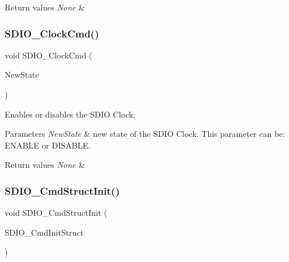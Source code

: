 \begin{DoxyRetVals}{Return values}
{\em None} & \\
\hline
\end{DoxyRetVals}
\mbox{\label{group___s_d_i_o___exported___functions_ga7243b857d6b323748ff3a493b265bedc}} 
\subsubsection{\texorpdfstring{SDIO\_ClockCmd()}{SDIO\_ClockCmd()}}
{\footnotesize\ttfamily void S\+D\+I\+O\+\_\+\+Clock\+Cmd (\begin{DoxyParamCaption}\item[{\mbox{\hyperlink{group___exported__types_gac9a7e9a35d2513ec15c3b537aaa4fba1}{Functional\+State}}}]{New\+State }\end{DoxyParamCaption})}



Enables or disables the S\+D\+IO Clock. 


\begin{DoxyParams}{Parameters}
{\em New\+State} & new state of the S\+D\+IO Clock. This parameter can be\+: E\+N\+A\+B\+LE or D\+I\+S\+A\+B\+LE. \\
\hline
\end{DoxyParams}

\begin{DoxyRetVals}{Return values}
{\em None} & \\
\hline
\end{DoxyRetVals}
\mbox{\label{group___s_d_i_o___exported___functions_ga09d9e89f49c87c82aec79c97b7068e24}} 
\subsubsection{\texorpdfstring{SDIO\_CmdStructInit()}{SDIO\_CmdStructInit()}}
{\footnotesize\ttfamily void S\+D\+I\+O\+\_\+\+Cmd\+Struct\+Init (\begin{DoxyParamCaption}\item[{\mbox{\hyperlink{struct_s_d_i_o___cmd_init_type_def}{S\+D\+I\+O\+\_\+\+Cmd\+Init\+Type\+Def}} $\ast$}]{S\+D\+I\+O\+\_\+\+Cmd\+Init\+Struct }\end{DoxyParamCaption})}



